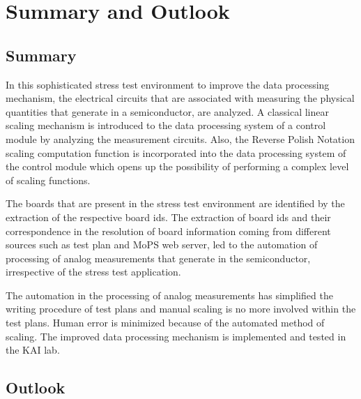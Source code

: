 \chapter{Summary and Outlook}

\section{Summary}

In this sophisticated stress test environment to improve the data processing mechanism, the electrical circuits that are associated with measuring the physical quantities that generate in a semiconductor, are analyzed.
A classical linear scaling mechanism is introduced to the data processing system of a control module by analyzing the measurement circuits.
Also, the Reverse Polish Notation scaling computation function is incorporated into the data processing system of the control module which opens up the possibility of performing a complex level of scaling functions.

The boards that are present in the stress test environment are identified by the extraction of the respective board ids.
The extraction of board ids and their correspondence in the resolution of board information coming from different sources such as test plan and MoPS web server, led to the automation of processing of analog measurements that generate in the semiconductor, irrespective of the stress test application. 

The automation in the processing of analog measurements has simplified the writing procedure of test plans and manual scaling is no more involved within the test plans. 
Human error is minimized because of the automated method of scaling.   
The improved data processing mechanism is implemented and tested in the KAI lab. 

\section{Outlook}

